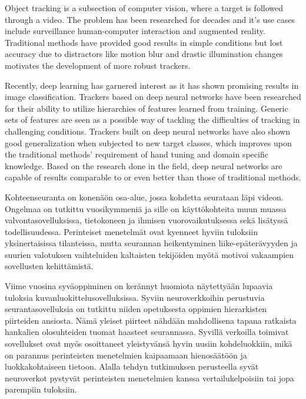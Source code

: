 
\begin{abstractpage}[english]
Object tracking is a subsection of computer vision, where a target is followed through
a video. The problem has been researched for decades and it's use cases include
surveillance human-computer interaction and augmented reality. Traditional methods
have provided good results in simple conditions but lost accuracy due to distractors
like motion blur and drastic illumination changes motivates the development of more
robust trackers.

Recently, deep learning has garnered interest as it has shown promising results in
image classification. Trackers based on deep neural networks have been researched
for their ability to utilize hierarchies of features learned from training. Generic
sets of features are seen as a possible way of tackling the difficulties of tracking
in challenging conditions. Trackers built on deep neural networks have also shown
good generalization when subjected to new target classes, which improves upon the
traditional methods' requirement of hand tuning and domain specific knowledge. Based
on the research done in the field, deep neural networks are capable of results
comparable to or even better than those of traditional methods.
\end{abstractpage}

\newpage
{}

\begin{abstractpage}[finnish]
Kohteenseuranta on konenäön osa-alue, jossa kohdetta seurataan läpi videon. Ongelmaa
on tutkittu vuosikymmeniä ja sille on käyttökohteita muun muassa valvontasovelluksissa,
tietokoneen ja ihmisen vuorovaikutuksessa sekä lisätyssä todellisuudessa. Perinteiset
menetelmät ovat kyenneet hyviin tuloksiin yksinertaisissa tilanteissa, mutta seurannan
heikentyminen liike-epäterävyyden ja suurien valotuksen vaihteluiden kaltaisten
tekijöiden myötä motivoi vakaampien sovellusten kehittämistä.

Viime vuosina syväoppiminen on kerännyt huomiota näytettyään lupaavia tuloksia
kuvanluokittelusovelluksissa. Syviin neuroverkkoihin perustuvia seurantasovelluksia
on tutkittu niiden opetuksesta oppimien hierarkisten piirteiden ansiosta. Nämä yleiset
piirteet nähdään mahdollisena tapana ratkaista hankalien olosuhteiden tuomat haasteet
seurannassa. Syvillä verkoilla toimivat sovellukset ovat myös osoittaneet yleistyvänsä
hyvin uusiin kohdeluokkiin, mikä on parannus perinteisten menetelmien kaipaamaan
hienosäätöön ja luokkakohtaiseen tietoon. Alalla tehdyn tutkimuksen perusteella
syvät neuroverkot pystyvät perinteisten menetelmien kanssa vertailukelpoisiin tai
jopa parempiin tuloksiin.
\end{abstractpage}
